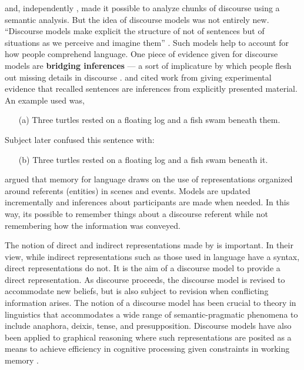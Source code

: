  \cite{Kamp:1993wm}  and, independently  \cite{Heim:1982wp},  made it possible to analyze chunks of discourse using a semantic analysis. But the idea of discourse models was not entirely new. ``Discourse models make explicit the structure of not of sentences but of situations as we perceive and imagine them''  \cite[p. 419]{JohnsonLaird:1983vt}.  Such models help to account for how people comprehend language. One piece of evidence given for discourse models are \textbf{bridging inferences} --- a sort of implicature by which people flesh out missing details in discourse  \citep{Clark:2002vz}. \cite{Stenning:2008uh} and \cite{JohnsonLaird:1989uj}  cited work from  \cite*{Bransford:1972tz}  giving experimental evidence that recalled sentences are inferences from explicitly presented material. An example used was,

\begin{itemize}
\item[(a)] Three turtles rested on a floating log and a fish swam beneath them.
\end{itemize}
Subject later confused this sentence with:
\begin{itemize}
\item[(b)] Three turtles rested on a floating log and a fish swam beneath it. 
\end{itemize}

 \cite{Bransford:1972tz}  argued that memory for language draws on the use of representations organized around referents (entities) in scenes and events. Models are updated incrementally and inferences about participants are made when needed. In this way, its possible to remember things about a discourse referent while not remembering how the information was conveyed.

The notion of direct and indirect representations made by  \cite{Stenning:1995ka}  is important. In their view, while indirect representations such as those used in language have a syntax, direct representations do not. It is the aim of a discourse model to provide a direct representation. As discourse proceeds, the discourse model is revised to accommodate new beliefs, but is also subject to revision when conflicting information arises. The notion of a discourse model has been crucial to theory in linguistics that accommodates a wide range of semantic-pragmatic phenomena to include anaphora, deixis, tense, and presupposition. Discourse models have also been applied to graphical reasoning where such representations are posited as a means to achieve efficiency in cognitive processing given constraints in working memory  \citep{Stenning:1995ka}. 

